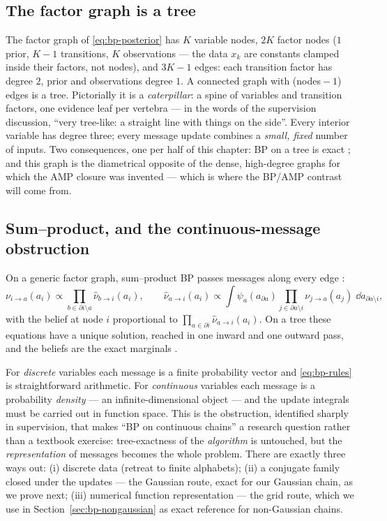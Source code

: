 \subsection{The factor graph is a tree}

The factor graph of \eqref{eq:bp-posterior} has $K$ variable nodes, $2K$
factor nodes ($1$ prior, $K{-}1$ transitions, $K$ observations --- the data
$x_k$ are constants clamped inside their factors, not nodes), and
$3K - 1$ edges: each transition factor has degree $2$, prior and
observations degree $1$. A connected graph with (nodes${}-1$) edges is a
tree. Pictorially it is a \emph{caterpillar}: a spine of variables and
transition factors, one evidence leaf per vertebra --- in the words of the
supervision discussion, ``very tree-like: a straight line with things on
the side''. Every interior variable has degree three; every message update
combines a \emph{small, fixed} number of inputs. Two consequences, one per
half of this chapter: BP on a tree is exact
\citep{pearl1988probabilistic, mezard2009information}; and this graph is
the diametrical opposite of the dense, high-degree graphs for which the AMP
closure was invented --- which is where the BP/AMP contrast will come from.

\subsection{Sum--product, and the continuous-message obstruction}

On a generic factor graph, sum--product BP passes messages along every edge
\citep{kschischang2001factor, mezard2009information}:
\begin{equation}
  \nu_{i \to a}(a_i) \propto
    \prod_{b \in \partial i \setminus a} \hat\nu_{b \to i}(a_i),
  \qquad
  \hat\nu_{a \to i}(a_i) \propto
    \int \psi_a(a_{\partial a})
    \prod_{j \in \partial a \setminus i} \nu_{j \to a}(a_j)\;
    \dd a_{\partial a \setminus i},
  \label{eq:bp-rules}
\end{equation}
with the belief at node $i$ proportional to
$\prod_{a \in \partial i} \hat\nu_{a \to i}(a_i)$. On a tree these
equations have a unique solution, reached in one inward and one outward
pass, and the beliefs are the exact marginals
\citep[Theorem~14.1]{mezard2009information}.

For \emph{discrete} variables each message is a finite probability vector
and \eqref{eq:bp-rules} is straightforward arithmetic. For
\emph{continuous} variables each message is a probability \emph{density} ---
an infinite-dimensional object --- and the update integrals must be carried
out in function space. This is the obstruction, identified sharply in
supervision, that makes ``BP on continuous chains'' a research question
rather than a textbook exercise: tree-exactness of the \emph{algorithm} is
untouched, but the \emph{representation} of messages becomes the whole
problem. There are exactly three ways out: (i) discrete data (retreat to
finite alphabets); (ii) a conjugate family closed under the updates ---
the Gaussian route, exact for our Gaussian chain, as we prove next;
(iii) numerical function representation --- the grid route, which we use
in Section~\ref{sec:bp-nongaussian} as exact reference for non-Gaussian
chains.

